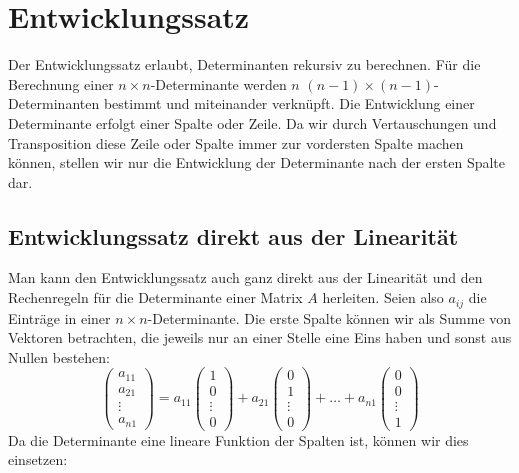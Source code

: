 \section{Entwicklungssatz\label{entwicklungssatz}}
Der Entwicklungssatz erlaubt, Determinanten rekursiv zu berechnen.
Für die Berechnung einer $n\times n$-Determinante werden $n$
$(n-1)\times(n-1)$-Determinanten bestimmt und miteinander verknüpft.
Die Entwicklung einer Determinante erfolgt einer Spalte oder Zeile.
Da wir durch Vertauschungen und Transposition diese Zeile oder Spalte
immer zur vordersten Spalte machen können, stellen wir nur die
Entwicklung der Determinante nach der ersten Spalte dar.



\subsection{Entwicklungssatz direkt aus der Linearität}
Man kann den Entwicklungssatz auch ganz direkt aus der Linearität
und den Rechenregeln für die Determinante einer Matrix $A$ herleiten.
Seien also $a_{ij}$ die Einträge in einer $n\times n$-Determinante.
Die erste Spalte können wir als Summe von Vektoren betrachten,
die jeweils nur an einer Stelle eine Eins haben und sonst aus
Nullen bestehen:
\[
\begin{pmatrix}
a_{11}\\a_{21}\\\vdots\\a_{n1}
\end{pmatrix}
=
a_{11}\begin{pmatrix}1\\0\\\vdots\\0\end{pmatrix}
+
a_{21}\begin{pmatrix}0\\1\\\vdots\\0\end{pmatrix}
+
\dots
+
a_{n1}\begin{pmatrix}0\\0\\\vdots\\1\end{pmatrix}
\]
Da die Determinante eine lineare Funktion der Spalten ist,
können wir dies einsetzen:
